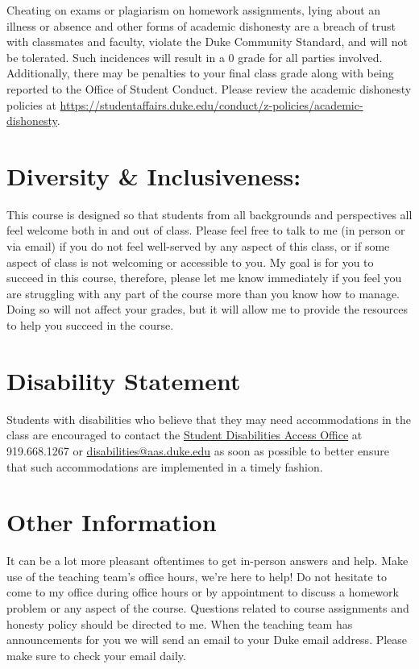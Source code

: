 \documentclass[11pt, a4paper]{article}
\begin{document}
Cheating on exams or plagiarism on homework assignments, lying about an illness or absence and other forms of academic dishonesty are a breach of trust with classmates and faculty, violate the Duke Community Standard, and will not be tolerated. Such incidences will result in a 0 grade for all parties involved. Additionally, there may be penalties to your final class grade along with being reported to the Office of Student Conduct. Please review the academic dishonesty policies at \url{https://studentaffairs.duke.edu/conduct/z-policies/academic-dishonesty}.


\section{Diversity \& Inclusiveness:}
This course is designed so that students from all backgrounds and perspectives all feel welcome both in and out of class. Please feel free to talk to me (in person or via email) if you do not feel well-served by any aspect of this class, or if some aspect of class is not welcoming or accessible to you. My goal is for you to succeed in this course, therefore, please let me know immediately if you feel you are struggling with any part of the course more than you know how to manage. Doing so will not affect your grades, but it will allow me to provide the resources to help you succeed in the course.


\section{Disability Statement} 
Students with disabilities who believe that they may need accommodations in the class are encouraged to contact the \href{https://access.duke.edu/students/staff.php}{Student Disabilities Access Office} at 919.668.1267 or \href{mailto:disabilities@aas.duke.edu}{disabilities@aas.duke.edu}  as soon as possible to better ensure that such accommodations are implemented in a timely fashion.


\section{Other Information} 
It can be a lot more pleasant oftentimes to get in-person answers and help. Make use of the teaching team's office hours, we're here to help! Do not hesitate to come to my office during office hours or by appointment to discuss a homework problem or any aspect of the course.  Questions related to course assignments and honesty policy should be directed to me. When the teaching team has announcements for you we will send an email to your Duke email address. Please make sure to check your email daily.
\end{document}
